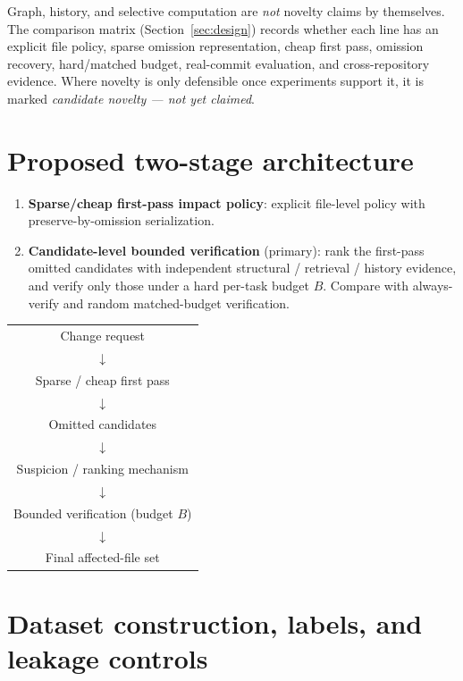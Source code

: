 \documentclass[11pt,a4paper]{article}
\begin{document}
Graph, history, and selective computation are \emph{not} novelty claims by
themselves. The comparison matrix (Section~\ref{sec:design}) records whether
each line has an explicit file policy, sparse omission representation, cheap
first pass, omission recovery, hard/matched budget, real-commit evaluation, and
cross-repository evidence. Where novelty is only defensible once experiments
support it, it is marked \emph{candidate novelty --- not yet claimed}.

\section{Proposed two-stage architecture}
\label{sec:architecture}

\begin{enumerate}
  \item \textbf{Sparse/cheap first-pass impact policy}: explicit file-level
        policy with preserve-by-omission serialization.
  \item \textbf{Candidate-level bounded verification} (primary): rank the
        first-pass omitted candidates with independent structural / retrieval /
        history evidence, and verify only those under a hard per-task budget
        $B$. Compare with always-verify and random matched-budget verification.
\end{enumerate}

\begin{center}
\begin{tabular}{@{}c@{}}
\hline
Change request \\
$\downarrow$ \\
Sparse / cheap first pass \\
$\downarrow$ \\
Omitted candidates \\
$\downarrow$ \\
Suspicion / ranking mechanism \\
$\downarrow$ \\
Bounded verification (budget $B$) \\
$\downarrow$ \\
Final affected-file set \\
\hline
\end{tabular}
\end{center}

\section{Dataset construction, labels, and leakage controls}
\label{sec:dataset}
\end{document}

